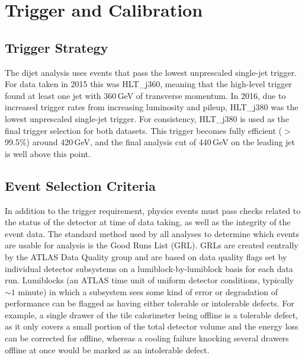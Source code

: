 
\chapter{Trigger and Calibration}
\label{ch:Calibration}

\section{Trigger Strategy}
The dijet analysis uses events that pass the lowest unprescaled single-jet trigger.  For data taken in 2015 this was HLT\_j360, meaning that the high-level trigger found at least one jet with 360\,GeV of transverse momentum.  In 2016, due to increased trigger rates from increasing luminosity and pileup, HLT\_j380 was the lowest unprescaled single-jet trigger.  For consistency, HLT\_j380 is used as the final trigger selection for both datasets.  This trigger becomes fully efficient ($>$99.5\%) around 420\,GeV, and the final analysis cut of 440\,GeV on the leading jet is well above this point.

\section{Event Selection Criteria}
In addition to the trigger requirement, physics events must pass checks related to the status of the detector at time of data taking, as well as the integrity of the event data.  The standard method used by all analyses to determine which events are usable for analysis is the Good Runs List (GRL).  GRLs are created centrally by the ATLAS Data Quality group and are based on data quality flags set by individual detector subsystems on a lumiblock-by-lumiblock basis for each data run.  Lumiblocks (an ATLAS time unit of uniform detector conditions, typically $\sim1$ minute) in which a subsystem sees some kind of error or degradation of performance can be flagged as having either tolerable or intolerable defects.  For example, a single drawer of the tile calorimeter being offline is a tolerable defect, as it only covers a small portion of the total detector volume and the energy loss can be corrected for offline, whereas a cooling failure knocking several drawers offline at once would be marked as an intolerable defect.

